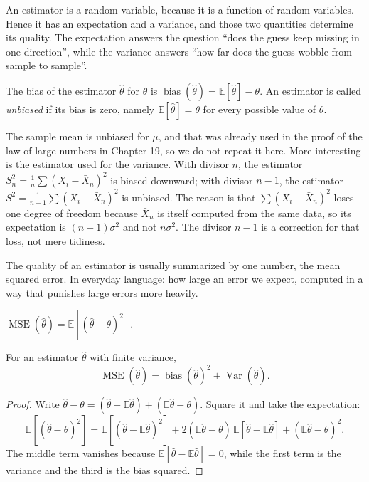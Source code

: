 An estimator is a random variable, because it is a function of random variables. Hence it has
an expectation and a variance, and those two quantities determine its quality. The expectation
answers the question ``does the guess keep missing in one direction'', while the variance
answers ``how far does the guess wobble from sample to sample''.

\begin{definisi}
The bias of the estimator $\hat\theta$ for $\theta$ is $\operatorname{bias}(\hat\theta)
=\mathbb{E}[\hat\theta]-\theta$. An estimator is called \emph{unbiased} if its bias is zero,
namely $\mathbb{E}[\hat\theta]=\theta$ for every possible value of $\theta$.
\end{definisi}

The sample mean is unbiased for $\mu$, and that was already used in the proof of the law of
large numbers in Chapter 19, so we do not repeat it here. More interesting is the estimator
used for the variance. With divisor $n$, the estimator
$S_n^2=\frac1n\sum(X_i-\bar X_n)^2$ is biased downward; with divisor $n-1$, the estimator
$S^2=\frac1{n-1}\sum(X_i-\bar X_n)^2$ is unbiased. The reason is that $\sum(X_i-\bar X_n)^2$
loses one degree of freedom because $\bar X_n$ is itself computed from the same data, so its
expectation is $(n-1)\sigma^2$ and not $n\sigma^2$. The divisor $n-1$ is a correction for that
loss, not mere tidiness.

The quality of an estimator is usually summarized by one number, the mean squared error. In
everyday language: how large an error we expect, computed in a way that punishes large errors
more heavily.

\begin{definisi}
$\operatorname{MSE}(\hat\theta)=\mathbb{E}[(\hat\theta-\theta)^2]$.
\end{definisi}

\begin{teorema}
For an estimator $\hat\theta$ with finite variance,
\[
\operatorname{MSE}(\hat\theta)=\operatorname{bias}(\hat\theta)^2
+\operatorname{Var}(\hat\theta).
\]
\end{teorema}

\begin{proof}[Proof]
Write $\hat\theta-\theta=(\hat\theta-\mathbb{E}\hat\theta)
+(\mathbb{E}\hat\theta-\theta)$. Square it and take the expectation:
\[
\mathbb{E}[(\hat\theta-\theta)^2]
=\mathbb{E}[(\hat\theta-\mathbb{E}\hat\theta)^2]
+2(\mathbb{E}\hat\theta-\theta)\,\mathbb{E}[\hat\theta-\mathbb{E}\hat\theta]
+(\mathbb{E}\hat\theta-\theta)^2 .
\]
The middle term vanishes because $\mathbb{E}[\hat\theta-\mathbb{E}\hat\theta]=0$, while the
first term is the variance and the third is the bias squared.
\end{proof}

